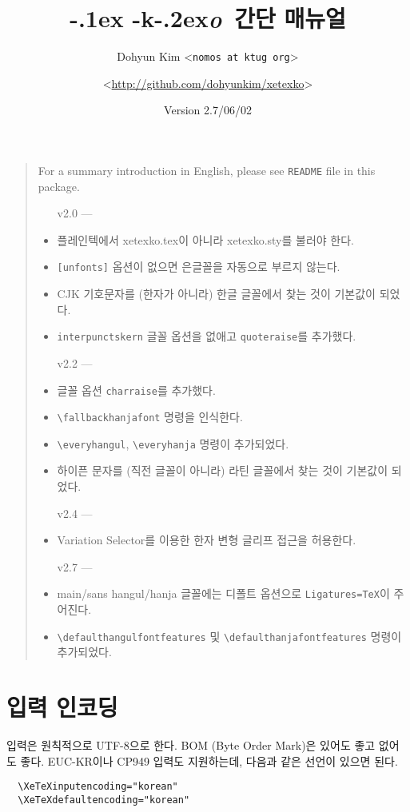 \documentclass[a4paper]{article}
\def\logoko{\textsf{k}\kern-.2ex\textit{o}}
\def\XeTeX{\hologo{XeTeX}}
\def\xetexko{\XeTeX\kern-.1ex -\logoko}
\def\cs#1{\texttt{\textbackslash #1}}
\def\hparen#1{{\small\hangulparens(#1)}}
\begin{document}
\title{\xetexko\ 간단 매뉴얼}
\author{Dohyun Kim \normalsize <\texttt{nomos at ktug org}> \and
  \normalsize <\url{http://github.com/dohyunkim/xetexko}>}
\date{Version 2.7/06/02}
\maketitle

\begin{quote}\small
  For a summary introduction in English,
  please see \verb+README+ file in this package.

  \begin{itemize}\itemsep=0pt
    \item[v2.0]---
    \item 플레인텍에서 xetexko.tex이 아니라 xetexko.sty를 불러야 한다.
    \item \verb+[unfonts]+ 옵션이 없으면 은글꼴을 자동으로 부르지 않는다.
    \item CJK 기호문자를 \hparen{한자가 아니라} 한글 글꼴에서 찾는 것이
      기본값이 되었다.
    \item \verb|interpunctskern| 글꼴 옵션을 없애고 \verb|quoteraise|를
      추가했다.
    \item[v2.2]---
    \item 글꼴 옵션 \verb|charraise|를 추가했다.
    \item \cs{fallbackhanjafont} 명령을 인식한다.
    \item \cs{everyhangul}, \cs{everyhanja} 명령이 추가되었다.
    \item 하이픈 문자를 \hparen{직전 글꼴이 아니라} 라틴 글꼴에서 찾는
      것이 기본값이 되었다.
    \item[v2.4]---
    \item Variation Selector를 이용한 한자 변형 글리프 접근을 허용한다.
    \item[v2.7]---
    \item main/sans hangul/hanja 글꼴에는 디폴트 옵션으로
      \verb|Ligatures=TeX|이 주어진다.
    \item \cs{defaulthangulfontfeatures} 및 \cs{defaulthanjafontfeatures}
      명령이 추가되었다.
  \end{itemize}
\end{quote}

\smallskip

\section{입력 인코딩}
입력은 원칙적으로 UTF-8으로 한다.
BOM (Byte Order Mark)은 있어도 좋고 없어도 좋다.
EUC-KR이나 CP949 입력도 지원하는데, 다음과 같은 선언이 있으면 된다.
\begin{verbatim}
  \XeTeXinputencoding="korean"
  \XeTeXdefaultencoding="korean"
\end{verbatim}
\end{document}
